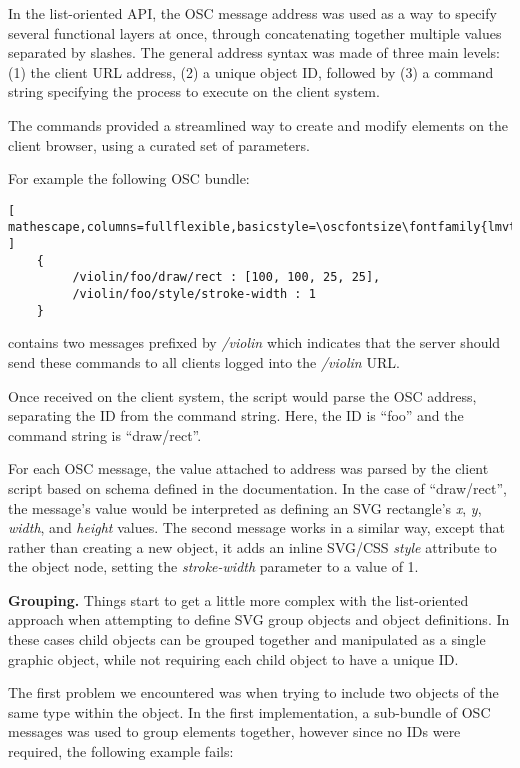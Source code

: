 In the list-oriented API, the OSC message address was used as a way to specify several functional layers at once, through concatenating together multiple values separated by slashes. The general address syntax was made of three main levels: (1) the client URL address, (2) a unique object ID, followed by (3) a command string specifying the process to execute on the client system.

The commands provided a streamlined way to create and modify elements on the client browser, using a curated set of parameters. 

For example the following OSC bundle:

\begin{lstlisting}[ mathescape,columns=fullflexible,basicstyle=\oscfontsize\fontfamily{lmvtt}\selectfont ]
    {
         /violin/foo/draw/rect : [100, 100, 25, 25],
         /violin/foo/style/stroke-width : 1
    }
\end{lstlisting}

\noindent
contains two messages prefixed by \textit{/violin} which indicates that the server should send these commands to all clients logged into the \textit{/violin} URL.

Once received on the client system, the script would parse the OSC address, separating the ID from the command string. 
Here, the ID is ``foo'' and the command string is ``draw/rect''.

For each OSC message, the value attached to address was parsed by the client script based on schema defined in the documentation.
In the case of ``draw/rect'', the message's value would be interpreted as defining an SVG rectangle's \textit{x},  \textit{y},  \textit{width}, and \textit{height} values.
The second message works in a similar way, except that rather than creating a new object, it adds an inline SVG/CSS \textit{style} attribute to the object node, setting the \textit{stroke-width} parameter to a value of 1.

\medskip
\noindent
\textbf{Grouping.} 
Things start to get a little more complex with the list-oriented approach when attempting to define SVG group objects and object definitions. 
In these cases child objects can be grouped together and manipulated as a single graphic object, while not requiring each child object to have a unique ID.

The first problem we encountered was when trying to include two objects of the same type within the object. 
In the first implementation, a sub-bundle of OSC messages was used to group elements together, however since no IDs were required, the following example fails:

